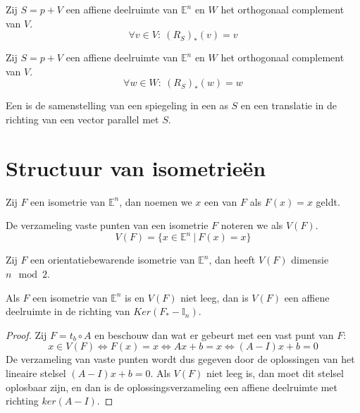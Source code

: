\documentclass[main.tex]{subfiles}
\begin{document}
\begin{lem}
  Zij $S=p+V$ een affiene deelruimte van $\mathbb{E}^{n}$ en $W$ het orthogonaal complement van $V$.
  \[ \forall v\in V:\ (R_{S})_{*}(v) = v \]
\end{lem}

\begin{lem}
  Zij $S=p+V$ een affiene deelruimte van $\mathbb{E}^{n}$ en $W$ het orthogonaal complement van $V$.
  \[ \forall w\in W:\ (R_{S})_{*}(w) = w \]
\end{lem}

\begin{de} 
  \examen
  Een  is de samenstelling van een spiegeling in een as $S$ en een translatie in de richting van een vector parallel met $S$.
\end{de}

\section{Structuur van isometrie\"en}
\label{sec:struct-van-isom}

\begin{de}
  Zij $F$ een isometrie van $\mathbb{E}^{n}$, dan noemen we $x$ een  van $F$ als $F(x)=x$ geldt.
\end{de}

\begin{de}
  De verzameling vaste punten van een isometrie $F$ noteren we als $V(F)$.
  \[ V(F) = \{ x \in \mathbb{E}^{n} \ |\ F(x) = x \} \]
\end{de}

\begin{ei}
  \examen
  Zij $F$ een orientatiebewarende isometrie van $\mathbb{E}^{n}$, dan heeft $V(F)$ dimensie $n\mod 2$.
\end{ei}

\begin{st}
  Als $F$ een isometrie van $\mathbb{E}^{n}$ is en $V(F)$ niet leeg, dan is $V(F)$ een affiene deelruimte in de richting van $Ker(F_{*}-\mathbb{I}_{n})$.

  \begin{proof}
    Zij $F=t_{b} \circ A$ en beschouw dan wat er gebeurt met een vast punt van $F$:
    \[ x\in V(F) \Leftrightarrow F(x) = x \Leftrightarrow Ax+b=x \Leftrightarrow (A-I)x+b = 0 \]
    De verzameling van vaste punten wordt dus gegeven door de oplossingen van het lineaire stelsel $(A-I)x+b=0$.
    Als $V(F)$ niet leeg is, dan moet dit stelsel oplosbaar zijn, en dan is de oplossingsverzameling een affiene deelruimte met richting $ker(A-I)$.
  \end{proof}
\end{st}
\end{document}
